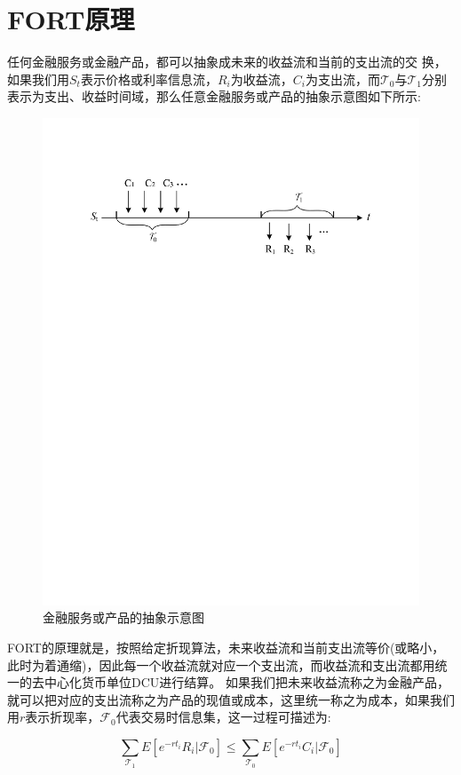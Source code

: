 \documentclass[letterpaper,11pt]{ctexart}
\begin{document}
\section{FORT原理}

任何金融服务或金融产品，都可以抽象成未来的收益流和当前的支出流的交
换，如果我们用$S_t$表示价格或利率信息流，$R_i$为收益流，$C_i$为支出流，而$\mathcal{T}_0$与$\mathcal{T}_1$分别表示为支出、收益时间域，那么任意金融服务或产品的抽象示意图如下所示:

\begin{figure}[h]
\centering
\includegraphics[width=4.5in]{fig-1}
\caption{金融服务或产品的抽象示意图}
\end{figure}

FORT的原理就是，按照给定折现算法，未来收益流和当前支出流等价(或略小，此时为着通缩)，因此每一个收益流就对应一个支出流，而收益流和支出流都用统一的去中心化货币单位DCU进行结算。
如果我们把未来收益流称之为金融产品，就可以把对应的支出流称之为产品的现值或成本，这里统一称之为成本，如果我们用$r$表示折现率，$\mathcal{F}_0$代表交易时信息集，这一过程可描述为:

\begin{equation}
\sum_{\mathcal{T}_1} E\left[e^{-rt_{i}}R_{i}|\mathcal{F}_0\right] \leq \sum_{\mathcal{T}_0} E\left[e^{-rt_{i}}C_{i}|\mathcal{F}_0\right] 
\label{e1}
\end{equation}
\end{document}
